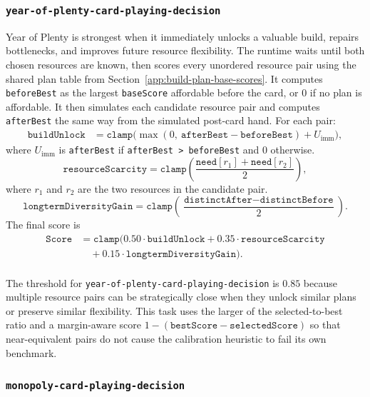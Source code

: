 \documentclass{article}
\begin{document}
\subsubsection{\texttt{year-of-plenty-card-playing-decision}}
\label{app:task-year-of-plenty-card-playing-decision}
Year of Plenty is strongest when it immediately unlocks a valuable build, repairs bottlenecks, and improves future resource flexibility.
The runtime waits until both chosen resources are known, then scores every unordered resource pair using the shared plan table from Section~\ref{app:build-plan-base-scores}. It computes \texttt{beforeBest} as the largest \texttt{baseScore} affordable before the card, or $0$ if no plan is affordable. It then simulates each candidate resource pair and computes \texttt{afterBest} the same way from the simulated post-card hand. For each pair:
\[
\begin{aligned}
\texttt{buildUnlock}
&= \texttt{clamp}\bigl(
\max(0,\ \texttt{afterBest} - \texttt{beforeBest}) + U_{\text{imm}}
\bigr),
\end{aligned}
\]
where $U_{\text{imm}}$ is \texttt{afterBest} if \texttt{afterBest > beforeBest} and $0$ otherwise.
\[
\texttt{resourceScarcity}
= \texttt{clamp}\left(\frac{\texttt{need}[r_1] + \texttt{need}[r_2]}{2}\right),
\]
where $r_1$ and $r_2$ are the two resources in the candidate pair.
\[
\texttt{longtermDiversityGain}
= \texttt{clamp}\left(\frac{\texttt{distinctAfter} - \texttt{distinctBefore}}{2}\right).
\]
The final score is
\[
\begin{aligned}
\texttt{Score}
&= \texttt{clamp}(
0.50 \cdot \texttt{buildUnlock}
+ 0.35 \cdot \texttt{resourceScarcity} \\
&\quad + 0.15 \cdot \texttt{longtermDiversityGain}).
\end{aligned}
\]
\\
The threshold for \texttt{year-of-plenty-card-playing-decision} is $0.85$ because multiple resource pairs can be strategically close when they unlock similar plans or preserve similar flexibility. This task uses the larger of the selected-to-best ratio and a margin-aware score $1-(\texttt{bestScore}-\texttt{selectedScore})$ so that near-equivalent pairs do not cause the calibration heuristic to fail its own benchmark.

\subsubsection{\texttt{monopoly-card-playing-decision}}
\label{app:task-monopoly-card-playing-decision}
\end{document}
